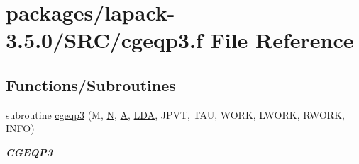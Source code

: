 \hypertarget{cgeqp3_8f}{}\section{packages/lapack-\/3.5.0/\+S\+R\+C/cgeqp3.f File Reference}
\label{cgeqp3_8f}
\subsection*{Functions/\+Subroutines}
\begin{DoxyCompactItemize}
\item 
subroutine \hyperlink{group__complexGEcomputational_ga3947eb2e884bf32f7380f22c501151e9}{cgeqp3} (M, \hyperlink{polmisc_8c_a0240ac851181b84ac374872dc5434ee4}{N}, \hyperlink{classA}{A}, \hyperlink{example__user_8c_ae946da542ce0db94dced19b2ecefd1aa}{L\+D\+A}, J\+P\+V\+T, T\+A\+U, W\+O\+R\+K, L\+W\+O\+R\+K, R\+W\+O\+R\+K, I\+N\+F\+O)
\begin{DoxyCompactList}\small\item\em {\bfseries C\+G\+E\+Q\+P3} \end{DoxyCompactList}\end{DoxyCompactItemize}
